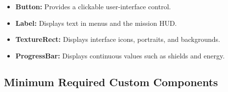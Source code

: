 \documentclass[journal]{IEEEtran}
\begin{document}
\begin{itemize}
    \item \textbf{Button:}
    Provides a clickable user-interface control.

    \item \textbf{Label:}
    Displays text in menus and the mission HUD.

    \item \textbf{TextureRect:}
    Displays interface icons, portraits, and backgrounds.

    \item \textbf{ProgressBar:}
    Displays continuous values such as shields and energy.

\end{itemize}

\subsection{Minimum Required Custom Components}
\end{document}
